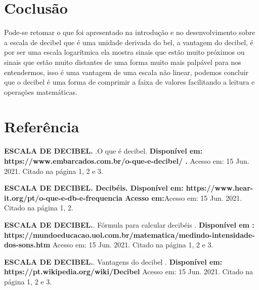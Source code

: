 \section{Coclusão}

Pode-se retomar o que foi apresentado na introdução e no desenvolvimento sobre a escala de decibel que é uma unidade derivada do bel, a  vantagem do decibel, é por ser uma escala logarítmica ela mostra sinais que estão muito próximos ou sinais que estão muito distantes de uma forma muito mais palpável para nos entendermos, isso é uma vantagem de uma escala não linear, podemos concluir  que o decibel é uma forma de comprimir a faixa de valores facilitando a leitura e operações matemáticas.
\newpage

\section{Referência}
\textbf{ESCALA DE DECIBEL. }.O que é decibel. \textbf{Disponível em: https://www.embarcados.com.br/o-que-e-decibel/ .} Acesso em: 15 Jun. 2021. Citado na página 1, 2 e 3.
\newline

\textbf{ESCALA DE DECIBEL. Decibéis. Disponível em: https://www.hear-it.org/pt/o-que-e-db-e-frequencia Acesso em:}Acesso em: 15  Jun. 2021. Citado na página 1, 2.
\newline

\textbf{ESCALA DE DECIBEL.}. Fórmula para calcular decibéis . \textbf{Disponível em : https://mundoeducacao.uol.com.br/matematica/medindo-intensidade-dos-sons.htm } Acesso em: 15 Jun. 2021. Citado na página 1, 2 e 3.
\newline

\textbf{ESCALA DE DECIBEL.}. Vantagens do decibel . \textbf{Disponível em: https://pt.wikipedia.org/wiki/Decibel}  Acesso em: 15  Jun. 2021. Citado na página 1, 2 e 3.

      
      

